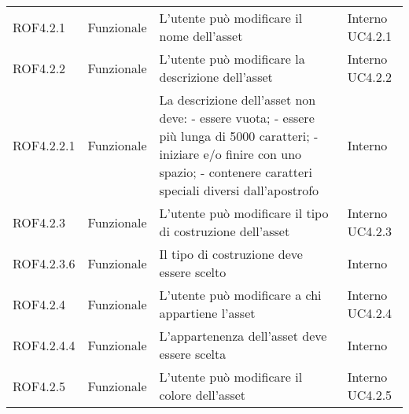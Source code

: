 \begin{longtable}{p{2cm}!{\VRule[1pt]}p{2cm}!{\VRule[1pt]}p{5cm}!{\VRule[1pt]}p{1.5cm}}
	\\
	ROF4.2.1                         & Funzionale\newline               & L'utente può modificare il nome dell'asset                                                                               & Interno \newline UC4.2.1     
	\\
	ROF4.2.2                         & Funzionale\newline               & L'utente può modificare la descrizione dell'asset                                                                        & Interno \newline UC4.2.2     
	\\
	ROF4.2.2.1&Funzionale\newline  & La descrizione dell'asset non deve:
	- essere vuota;
	- essere più lunga di 5000 caratteri; 
	- iniziare e/o finire con uno spazio;
	- contenere caratteri speciali diversi dall'apostrofo & Interno \\
	ROF4.2.3                         & Funzionale\newline               & L'utente può modificare il tipo di costruzione dell'asset                                                                & Interno \newline UC4.2.3     
	\\
	ROF4.2.3.6                       & Funzionale\newline               & Il tipo di costruzione deve essere scelto                                                                                 & Interno                      \\
	ROF4.2.4                         & Funzionale\newline               & L'utente può modificare a chi appartiene l'asset                                                                         & Interno \newline UC4.2.4     
	\\
	ROF4.2.4.4                       & Funzionale\newline               & L'appartenenza dell'asset deve essere scelta                                                                              & Interno                      \\
	ROF4.2.5                         & Funzionale\newline               & L'utente può modificare il colore dell'asset                                                                             & Interno \newline UC4.2.5     

\end{longtable}
